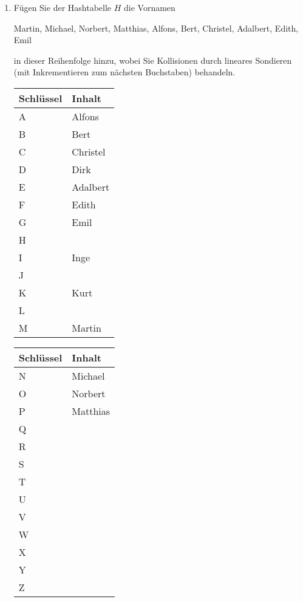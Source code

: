 \documentclass{bschlangaul-aufgabe}
\begin{document}
\begin{enumerate}

\item Fügen Sie der Hashtabelle $H$ die Vornamen

\begin{center}
Martin, Michael, Norbert, Matthias, Alfons, Bert, Christel, Adalbert,
Edith, Emil
\end{center}

in dieser Reihenfolge hinzu, wobei Sie Kollisionen durch lineares
Sondieren (mit Inkrementieren zum nächsten Buchstaben) behandeln.

\begin{liAntwort}
\begin{multicols}{2}
\noindent
\begin{tabularx}{\linewidth}{|l||X|}
\hline
Schlüssel & Inhalt \\\hline\hline
A & Alfons \\\hline
B & Bert \\\hline
C & Christel \\\hline
D & Dirk \\\hline
E & Adalbert \\\hline
F & Edith \\\hline
G & Emil \\\hline
H & \\\hline
I & Inge \\\hline
J & \\\hline
K & Kurt \\\hline
L & \\\hline
M & Martin \\\hline
\end{tabularx}

\noindent
\begin{tabularx}{\linewidth}{|l||X|}
\hline
Schlüssel & Inhalt \\\hline\hline
N & Michael \\\hline
O & Norbert \\\hline
P & Matthias \\\hline
Q & \\\hline
R & \\\hline
S & \\\hline
T & \\\hline
U & \\\hline
V & \\\hline
W & \\\hline
X & \\\hline
Y & \\\hline
Z & \\\hline
\end{tabularx}
\end{multicols}
\bigskip
\end{liAntwort}


\end{enumerate}
\end{document}
